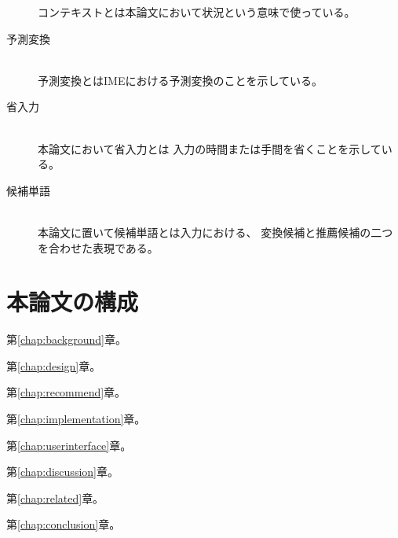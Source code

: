 \begin{description}
    コンテキストとは本論文において状況という意味で使っている。
  \item[予測変換]\mbox{}\\
    予測変換とはIMEにおける予測変換のことを示している。
  \item[省入力]\mbox{}\\
    本論文において省入力とは
    入力の時間または手間を省くことを示している。
  \item[候補単語]\mbox{}\\
    本論文に置いて候補単語とは入力における、
    変換候補と推薦候補の二つを合わせた表現である。
\end{description}

\section{本論文の構成}


第\ref{chap:background}章。

第\ref{chap:design}章。

第\ref{chap:recommend}章。

第\ref{chap:implementation}章。

第\ref{chap:userinterface}章。

第\ref{chap:discussion}章。

第\ref{chap:related}章。

第\ref{chap:conclusion}章。

